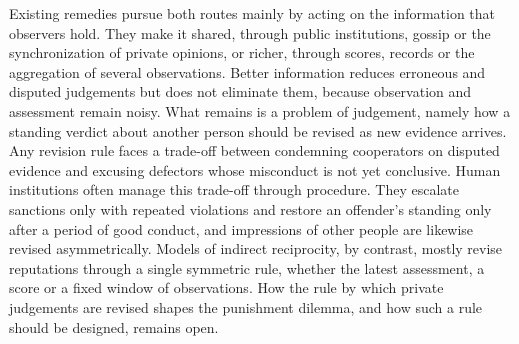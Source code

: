 Existing remedies pursue both routes mainly by acting on the information that observers hold. They make it shared, through public institutions, gossip or the synchronization of private opinions\cite{radzvilavicius2021,kawakatsu2024,murase2024synchronization,tham2026}, or richer, through scores, records or the aggregation of several observations\cite{schmid2023,clark2020,michelmata2024}. Better information reduces erroneous and disputed judgements but does not eliminate them, because observation and assessment remain noisy\cite{hilbe2018,fujimoto2023}. What remains is a problem of judgement, namely how a standing verdict about another person should be revised as new evidence arrives. Any revision rule faces a trade-off between condemning cooperators on disputed evidence and excusing defectors whose misconduct is not yet conclusive. Human institutions often manage this trade-off through procedure. They escalate sanctions only with repeated violations\cite{ostrom1990,cox2010} and restore an offender's standing only after a period of good conduct\cite{blumstein2009}, and impressions of other people are likewise revised asymmetrically\cite{skowronski1989,slovic1993,mendesiedlecki2013diagnostic,siegel2018}. Models of indirect reciprocity, by contrast, mostly revise reputations through a single symmetric rule, whether the latest assessment, a score or a fixed window of observations\cite{ohtsuki2004,hilbe2018,schmid2023,michelmata2024}. How the rule by which private judgements are revised shapes the punishment dilemma, and how such a rule should be designed, remains open.
